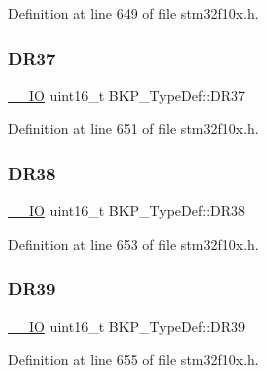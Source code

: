 Definition at line 649 of file stm32f10x.\+h.

\mbox{\label{struct_b_k_p___type_def_aa1f71e6639cfcc903c534596672fb007}} 
\subsubsection{\texorpdfstring{D\+R37}{DR37}}
{\footnotesize\ttfamily \hyperlink{core__sc300_8h_aec43007d9998a0a0e01faede4133d6be}{\+\_\+\+\_\+\+IO} uint16\+\_\+t B\+K\+P\+\_\+\+Type\+Def\+::\+D\+R37}



Definition at line 651 of file stm32f10x.\+h.

\mbox{\label{struct_b_k_p___type_def_accfaf41ee048545b7c9c0ed069165c6e}} 
\subsubsection{\texorpdfstring{D\+R38}{DR38}}
{\footnotesize\ttfamily \hyperlink{core__sc300_8h_aec43007d9998a0a0e01faede4133d6be}{\+\_\+\+\_\+\+IO} uint16\+\_\+t B\+K\+P\+\_\+\+Type\+Def\+::\+D\+R38}



Definition at line 653 of file stm32f10x.\+h.

\mbox{\label{struct_b_k_p___type_def_a599452e0f9d6e1e1fa75730aec9228fd}} 
\subsubsection{\texorpdfstring{D\+R39}{DR39}}
{\footnotesize\ttfamily \hyperlink{core__sc300_8h_aec43007d9998a0a0e01faede4133d6be}{\+\_\+\+\_\+\+IO} uint16\+\_\+t B\+K\+P\+\_\+\+Type\+Def\+::\+D\+R39}



Definition at line 655 of file stm32f10x.\+h.

\mbox{\label{struct_b_k_p___type_def_a02abe76a58a7f018ea450221c955ab30}} 
